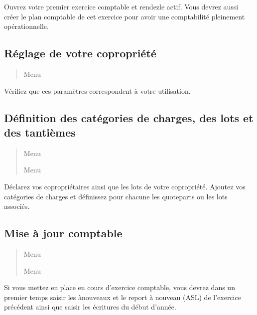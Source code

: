 \documentclass[a4paper,10pt,oneside,french]{sphinxmanual}
\begin{document}
Ouvrez votre premier exercice comptable et rendez\sphinxhyphen{}le actif.
Vous devrez aussi créer le plan comptable de cet exercice pour avoir une comptabilité pleinement opérationnelle.


\subsection{Réglage de votre copropriété}
\label{\detokenize{syndic/first_step:reglage-de-votre-copropriete}}\begin{quote}

Menu 
\end{quote}

Vérifiez que ces paramètres correspondent à votre utilisation.


\subsection{Définition des catégories de charges, des lots et des tantièmes}
\label{\detokenize{syndic/first_step:definition-des-categories-de-charges-des-lots-et-des-tantiemes}}\begin{quote}

Menu 

Menu 
\end{quote}

Déclarez vos copropriétaires ainsi que les lots de votre copropriété.
Ajoutez vos catégories de charges et définissez pour chacune les quote\sphinxhyphen{}parts ou les lots associés.


\subsection{Mise à jour comptable}
\label{\detokenize{syndic/first_step:mise-a-jour-comptable}}\begin{quote}

Menu 

Menu 
\end{quote}

Si vous mettez en place  en cours d’exercice comptable, vous devrez dans un premier temps saisir les à\sphinxhyphen{}nouveaux et le report à nouveau (ASL) de l’exercice précédent ainsi que saisir les écritures du début d’année.
\end{document}
